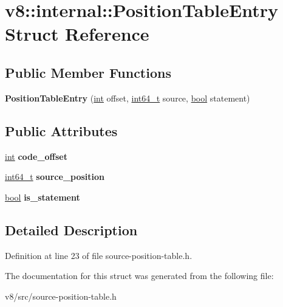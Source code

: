 \hypertarget{structv8_1_1internal_1_1PositionTableEntry}{}\section{v8\+:\+:internal\+:\+:Position\+Table\+Entry Struct Reference}
\label{structv8_1_1internal_1_1PositionTableEntry}
\subsection*{Public Member Functions}
\begin{DoxyCompactItemize}
\item 
\mbox{\label{structv8_1_1internal_1_1PositionTableEntry_a6270ad3c7385ff48c6679cde1d2cdb77}} 
{\bfseries Position\+Table\+Entry} (\mbox{\hyperlink{classint}{int}} offset, \mbox{\hyperlink{classint64__t}{int64\+\_\+t}} source, \mbox{\hyperlink{classbool}{bool}} statement)
\end{DoxyCompactItemize}
\subsection*{Public Attributes}
\begin{DoxyCompactItemize}
\item 
\mbox{\label{structv8_1_1internal_1_1PositionTableEntry_a75ca1ce373d1f3ae3ed0776ecd2fbbe4}} 
\mbox{\hyperlink{classint}{int}} {\bfseries code\+\_\+offset}
\item 
\mbox{\label{structv8_1_1internal_1_1PositionTableEntry_a0f07482bfb70a8cf58fc4497fa8263eb}} 
\mbox{\hyperlink{classint64__t}{int64\+\_\+t}} {\bfseries source\+\_\+position}
\item 
\mbox{\label{structv8_1_1internal_1_1PositionTableEntry_a6b9aa21e793ff3f648357cb1b3a2fd97}} 
\mbox{\hyperlink{classbool}{bool}} {\bfseries is\+\_\+statement}
\end{DoxyCompactItemize}


\subsection{Detailed Description}


Definition at line 23 of file source-\/position-\/table.\+h.



The documentation for this struct was generated from the following file\+:\begin{DoxyCompactItemize}
\item 
v8/src/source-\/position-\/table.\+h\end{DoxyCompactItemize}
